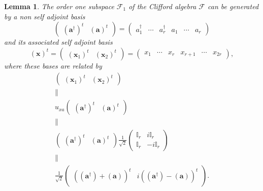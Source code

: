 \documentclass[aps,preprint]{revtex4}
\newtheorem{lemma}[theorem]{Lemma}
\begin{document}
\begin{lemma}
The order one subspace $\mathcal{F}_{1}$ of the Clifford algebra $\mathcal{F}
$ can be generated by a non self adjoint basis 
\begin{equation}
\left( 
\begin{array}{cc}
\left( \boldsymbol{a}^{\dagger }\right) ^{t} & \left( \boldsymbol{a}\right)
^{t}%
\end{array}%
\right) =\left( 
\begin{array}{cccccc}
a_{1}^{\dagger } & \cdots & a_{r}^{\dagger } & a_{1} & \cdots & a_{r}%
\end{array}%
\right)
\end{equation}%
and its associated self adjoint basis 
\begin{equation}
\left( \boldsymbol{x}\right) ^{t}=\left( 
\begin{array}{cc}
\left( \boldsymbol{x}_{1}\right) ^{t} & \left( \boldsymbol{x}_{2}\right) ^{t}%
\end{array}%
\right) =\left( 
\begin{array}{cccccc}
x_{1} & \cdots & x_{r} & x_{r+1} & \cdots & x_{2r}%
\end{array}%
\right) ,
\end{equation}%
where these bases are related by 
\begin{gather}
\left( 
\begin{array}{cc}
\left( \boldsymbol{x}_{1}\right) ^{t} & \left( \boldsymbol{x}_{2}\right) ^{t}%
\end{array}%
\right) \\
\parallel \\
u_{xa}\left( 
\begin{array}{cc}
\left( \boldsymbol{a}^{\dagger }\right) ^{t} & \left( \boldsymbol{a}\right)
^{t}%
\end{array}%
\right) \\
\parallel \\
\left( 
\begin{array}{cc}
\left( \boldsymbol{a}^{\dagger }\right) ^{t} & \left( \boldsymbol{a}\right)
^{t}%
\end{array}%
\right) \frac{1}{\sqrt{2}}\left( 
\begin{array}{cc}
\mathbb{I}_{r} & i\mathbb{I}_{r} \\ 
\mathbb{I}_{r} & -i\mathbb{I}_{r}%
\end{array}%
\right) \\
\parallel \\
\frac{1}{\sqrt{2}}\left( 
\begin{array}{cc}
\left( \overset{}{\left( \boldsymbol{a}^{\dagger }\right) +\left( 
\boldsymbol{a}\right) }\right) ^{t} & i\left( \overset{}{\left( \boldsymbol{a%
}^{\dagger }\right) -\left( \boldsymbol{a}\right) }\right) ^{t}%
\end{array}%
\right) .
\end{gather}
\end{lemma}
\end{document}
